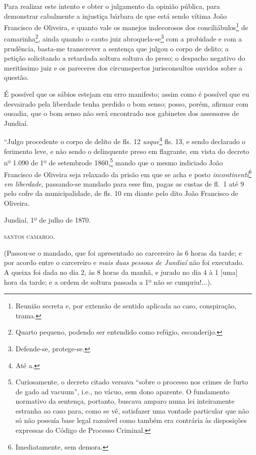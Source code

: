 Para realizar este intento e obter o julgamento da opinião pública, para
demonstrar cabalmente a injustiça bárbara de que está sendo vítima João
Francisco de Oliveira, e quanto vale os manejos indecorosos dos
conciliábulos\footnote{ Reunião secreta e, por extensão de sentido
  aplicada ao caso, conspiração, trama.} de camarinha\footnote{ Quarto
  pequeno, podendo ser entendido como refúgio, esconderijo.}, ainda
quando o cauto juiz abroquela-se\footnote{ Defende-se, protege-se.} com
a probidade e com a prudência, basta-me transcrever a sentença que
julgou o corpo de delito; a petição solicitando a retardada soltura
soltura do preso; o despacho negativo do meritíssimo juiz e os pareceres
dos circunspectos jurisconsultos ouvidos sobre a questão.

É possível que os sábios estejam em erro manifesto; assim como é
possível que eu desvairado pela liberdade tenha perdido o bom senso;
posso, porém, afirmar com ousadia, que o bom senso não será encontrado
nos gabinetes dos assessores de Jundiaí.

\asterisc{}

``Julgo procedente o corpo de delito de fls. 12 \emph{usque}\footnote{
  Até a.} fls. 13, e sendo declarado o ferimento leve, e não sendo o
delinquente preso em flagrante, em vista do decreto nº 1.090 de 1º de
setembrode 1860,\footnote{ Curiosamente, o decreto citado versava
  ``sobre o processo nos crimes de furto de gado ad vacuum'', i.e., no
  vácuo, sem dono aparente. O fundamento normativo da sentença,
  portanto, buscava amparo numa lei inteiramente estranha ao caso para,
  como se vê, satisfazer uma vontade particular que não só não possuía
  base legal razoável como também era contrária às disposições expressas
  do Código de Processo Criminal.} mando que o mesmo indiciado João
Francisco de Oliveira seja relaxado da prisão em que se acha e posto
\emph{incontinenti}\footnote{ Imediatamente, sem demora.} \emph{em
liberdade}, passando-se mandado para esse fim, pagas as custas de fl.~1
até 9 pelo cofre da municipalidade, de fls. 10 em diante pelo dito João
Francisco de Oliveira.
\begin{flushright}
Jundiaí, 1º de julho de 1870.

\textsc{santos camargo}.
\end{flushright}
(Passou-se o mandado, que foi apresentado ao carcereiro às 6 horas da
tarde; e por acordo entre o carcereiro e \emph{mais duas pessoas de
Jundiaí} não foi executado.\\
A queixa foi dada no dia 2, às 8 horas da manhã, e jurado no dia 4 à 1
{[}uma{]} hora da tarde; e a ordem de soltura passada a 1º não se
cumpriu!...).

